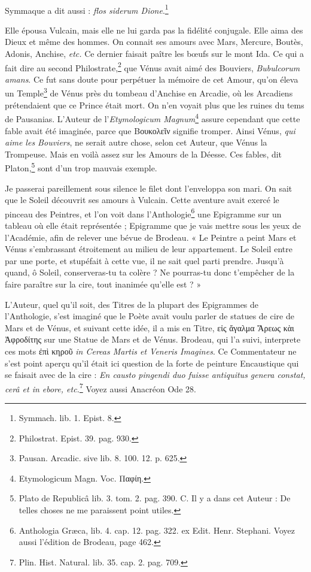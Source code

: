 \documentclass[a4paper, 18pt, oneside]{article}
\begin{document}
\paragraph{}
Symmaque a dit aussi : \emph{flos siderum Dione}.\footnote{Symmach. lib. 1. Epist. 8.}

Elle épousa Vulcain, mais elle ne lui garda pas la fidélité conjugale. Elle aima des Dieux et même des hommes. On connait ses amours avec Mars, Mercure, Boutès, Adonis, Anchise, \emph{etc.} Ce dernier faisait paître les bœufs sur le mont Ida. Ce qui a fait dire au second Philostrate,\footnote{Philostrat. Epist. 39. pag. 930.} que Vénus avait aimé des Bouviers, \emph{Bubulcorum amans}. Ce fut sans doute pour perpétuer la mémoire de cet Amour, qu'on éleva un Temple\footnote{Pausan. Arcadic. sive lib. 8. 100. 12. p. 625.} de Vénus près du tombeau d'Anchise en Arcadie, où les Arcadiens prétendaient que ce Prince était mort. On n'en voyait plus que les ruines du tems de Pausanias. L'Auteur de l'\emph{Etymologicum Magnum}\footnote{Etymologicum Magn. Voc. Παφίη.} assure cependant que cette fable avait été imaginée, parce que Βουκολεῖν signifie tromper. Ainsi Vénus, \emph{qui aime les Bouviers}, ne serait autre chose, selon cet Auteur, que Vénus la Trompeuse. Mais en voilà assez sur les Amours de la Déesse. Ces fables, dit Platon,\footnote{Plato de Republicâ lib. 3. tom. 2. pag. 390. C. Il y a dans cet Auteur : De telles choses ne me paraissent point utiles.} sont d'un trop mauvais exemple.

Je passerai pareillement sous silence le filet dont l'enveloppa son mari. On sait que le Soleil découvrit ses amours à Vulcain. Cette aventure avait exercé le pinceau des Peintres, et l'on voit dans l'Anthologie\footnote{Anthologia Græca, lib. 4. cap. 12. pag. 322. ex Edit. Henr. Stephani. Voyez aussi l'édition de Brodeau, page 462.} une Epigramme sur un tableau où elle était représentée ; Epigramme que je vais mettre sous les yeux de l'Académie, afin de relever une bévue de Brodeau. « Le Peintre a peint Mars et Vénus s'embrassant étroitement au milieu de leur appartement. Le Soleil entre par une porte, et stupéfait à cette vue, il ne sait quel parti prendre. Jusqu'à quand, ô Soleil, conserveras-tu ta colère ? Ne pourras-tu donc t'empêcher de la faire paraître sur la cire, tout inanimée qu'elle est ? »

L'Auteur, quel qu'il soit, des Titres de la plupart des Epigrammes de l'Anthologie, s'est imaginé que le Poète avait voulu parler de statues de cire de Mars et de Vénus, et suivant cette idée, il a mis en Titre, εἰς ἄγαλμα Ἄρεως κὰι Ἀφροδίτης sur une Statue de Mars et de Vénus. Brodeau, qui l'a suivi, interprete ces mots ἐπὶ κηροῦ \emph{in Cereas Martis et Veneris Imagines}. Ce Commentateur ne s'est point aperçu qu'il était ici question de la forte de peinture Encaustique qui se faisait avec de la cire : \emph{En causto pingendi duo fuisse antiquitus genera constat, cerâ et in ebore, etc.}\footnote{Plin. Hist. Natural. lib. 35. cap. 2. pag. 709.} Voyez aussi Anacréon Ode 28.
\end{document}
